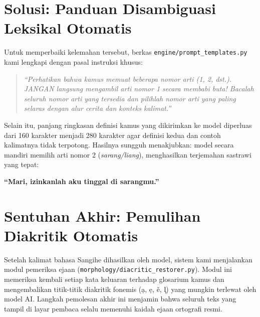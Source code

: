 \section{Solusi: Panduan Disambiguasi Leksikal Otomatis}
Untuk memperbaiki kelemahan tersebut, berkas \texttt{engine/prompt\_templates.py} kami lengkapi dengan pasal instruksi khusus:
\begin{quote}
\itshape
“Perhatikan bahwa kamus memuat beberapa nomor arti (1, 2, dst.). JANGAN langsung mengambil arti nomor 1 secara membabi buta! Bacalah seluruh nomor arti yang tersedia dan pilihlah nomor arti yang paling selaras dengan alur cerita dan konteks kalimat.”
\end{quote}

Selain itu, panjang ringkasan definisi kamus yang dikirimkan ke model diperluas dari 160 karakter menjadi 280 karakter agar definisi kedua dan contoh kalimatnya tidak terpotong. Hasilnya sungguh menakjubkan: model secara mandiri memilih arti nomor 2 (\textit{sarang/liang}), menghasilkan terjemahan sastrawi yang tepat:
\begin{center}
\textbf{“Mari, izinkanlah aku tinggal di sarangmu.”}
\end{center}

\section{Sentuhan Akhir: Pemulihan Diakritik Otomatis}
Setelah kalimat bahasa Sangihe dihasilkan oleh model, sistem kami menjalankan modul pemeriksa ejaan (\texttt{morphology/diacritic\_restorer.py}). Modul ini memeriksa kembali setiap kata keluaran terhadap glosarium kamus dan mengembalikan titik-titik diakritik fonemis (\d{a}, \d{e}, \v{e}, l᷊) yang mungkin terlewat oleh model AI. Langkah pemolesan akhir ini menjamin bahwa seluruh teks yang tampil di layar pembaca selalu memenuhi kaidah ejaan ortografi resmi.
